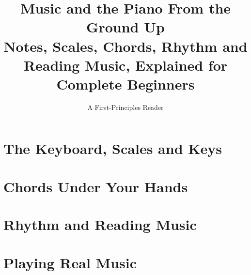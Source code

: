 \documentclass[11pt,oneside]{book}
\title{\textbf{Music and the Piano From the Ground Up}\\[0.4em]
\large Notes, Scales, Chords, Rhythm and Reading Music, Explained for Complete Beginners}
\author{A First-Principles Reader}
\date{}
\begin{document}
\frontmatter
\maketitle
\tableofcontents



\mainmatter

\part{The Keyboard, Scales and Keys}



\part{Chords Under Your Hands}



\part{Rhythm and Reading Music}



\part{Playing Real Music}

\end{document}
